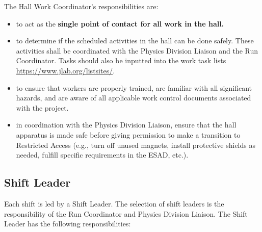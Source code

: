 \documentclass[10pt]{article}
\begin{document}
The Hall Work Coordinator's responsibilities are:

\begin{itemize}

\item  to act as the {\bf single point of contact for all work in the hall.}

\item to determine if the scheduled activities in the hall can be done safely.
These activities shall be coordinated with the Physics Division Liaison
and the Run Coordinator.   Tasks should also be inputted into the work task
lists \url{https://www.jlab.org/listsites/}.

\item to ensure that workers are properly trained, are familiar with all
significant hazards, and are aware of all applicable work control
documents associated with the project.

\item in coordination with the Physics Division Liaison,
ensure that the hall apparatus is made safe before giving permission to
make a transition to Restricted Access (e.g., turn off unused magnets,
install protective shields as needed, fulfill specific requirements in the
ESAD, etc.).


\end{itemize}

\subsection{Shift Leader}

Each shift is led by a Shift Leader. The selection of shift leaders
is the responsibility of the Run Coordinator and Physics Division Liaison.
The  Shift Leader has the following responsibilities:
\end{document}
